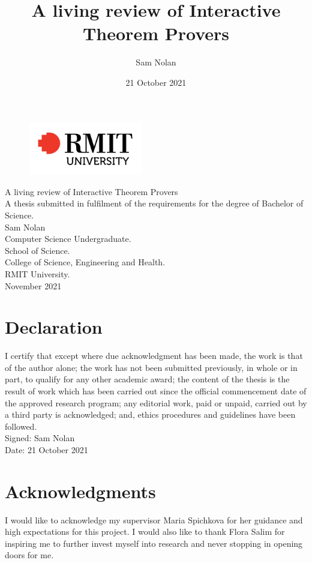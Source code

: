 \documentclass[
]{article}
\title{A living review of Interactive Theorem Provers}
\author{Sam Nolan}
\date{21 October 2021}
\begin{document}
\begin{titlepage}
\begin{figure}[t!]
\centering
\includegraphics[width=5cm]{Images/rmit-logo.png}
\end{figure}

\vspace*{2cm}

\begin{center}
{\large
  A living review of Interactive Theorem Provers\\
	[1cm]
	A thesis submitted in fulfilment of the requirements for the degree of Bachelor of Science.\\
	[2cm]
	Sam Nolan\\
	[0.5cm]
	Computer Science Undergraduate.\\
	[3cm]
	School of Science.\\
	[0.5cm]
	College of Science, Engineering and Health.\\
	[0.5cm]
	RMIT University.\\
	[2cm]
  November 2021\\
}
\end{center}
	
\end{titlepage}

\section*{Declaration}
I certify that except where due acknowledgment has been made, the work
is that of the author alone; the work has not been submitted previously,
in whole or in part, to qualify for any other academic award; the
content of the thesis is the result of work which has been carried out
since the official commencement date of the approved research program;
any editorial work, paid or unpaid, carried out by a third party is
acknowledged; and, ethics procedures and guidelines have been
followed.\\
[1cm]
Signed: Sam Nolan\\
[1cm]
Date: 21 October 2021\\

\section*{Acknowledgments}
I would like to acknowledge my supervisor Maria Spichkova for her
guidance and high expectations for this project. I would also like to
thank Flora Salim for inspiring me to further invest myself into
research and never stopping in opening doors for me.
\end{document}

